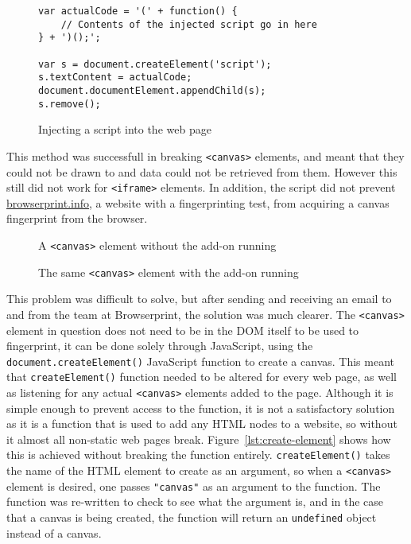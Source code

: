 \begin{figure}[h!]
\begin{lstlisting}
var actualCode = '(' + function() {
    // Contents of the injected script go in here
} + ')();';

var s = document.createElement('script');
s.textContent = actualCode;
document.documentElement.appendChild(s);
s.remove();
\end{lstlisting}
\caption{Injecting a script into the web page}
\label{lst:injection}
\end{figure}

This method was successfull in breaking \texttt{<canvas>} elements, and meant that they could not be drawn to and data could not be retrieved from them.
However this still did not work for \texttt{<iframe>} elements.
In addition, the script did not prevent \url{browserprint.info}, a website with a fingerprinting test, from acquiring a canvas fingerprint from the browser.

\begin{figure}[!tbp]
    \centering
    \begin{minipage}[b]{0.4\textwidth}
        \caption{A \texttt{<canvas>} element without the add-on running}
        \label{fig:hello-world-canvas}
    \end{minipage}
    \hfill
    \begin{minipage}[b]{0.4\textwidth}
        \caption{The same \texttt{<canvas>} element with the add-on running}
        \label{fig:blank-canvas}
    \end{minipage}
\end{figure}

This problem was difficult to solve, but after sending and receiving an email to and from the team at Browserprint, the solution was much clearer.
The \texttt{<canvas>} element in question does not need to be in the DOM itself to be used to fingerprint, it can be done solely through JavaScript, using the \texttt{document.createElement()} JavaScript function to create a canvas.
This meant that \texttt{createElement()} function needed to be altered for every web page, as well as listening for any actual \texttt{<canvas>} elements added to the page.
Although it is simple enough to prevent access to the function, it is not a satisfactory solution as it is a function that is used to add any HTML nodes to a website, so without it almost all non-static web pages break.
Figure~\ref{lst:create-element} shows how this is achieved without breaking the function entirely.
\texttt{createElement()} takes the name of the HTML element to create as an argument, so when a \texttt{<canvas>} element is desired, one passes \texttt{"canvas"} as an argument to the function.
The function was re-written to check to see what the argument is, and in the case that a canvas is being created, the function will return an \texttt{undefined} object instead of a canvas.

